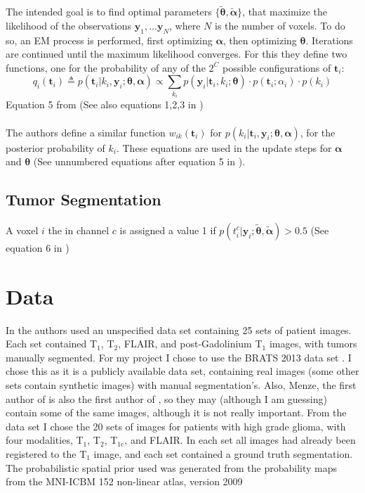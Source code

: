 \documentclass[10pt,twocolumn,letterpaper]{article}
\begin{document}
The intended goal is to find optimal parameters $\{\boldsymbol{\tilde{\theta}},\boldsymbol{\tilde{\alpha}}\}$, that maximize the likelihood of the observations $\boldsymbol{y}_1,...\boldsymbol{y}_N$, where $N$ is the number of voxels. To do so, an EM process is performed, first optimizing $\boldsymbol{\alpha}$, then optimizing $\boldsymbol{\theta}$. Iterations are continued until the maximum likelihood converges. For this they define two functions, one for the probability of any of the $2^C$ possible configurations of $\textbf{t}_i$:
\begin{equation}
q_i(\textbf{t}_i)\triangleq p(\textbf{t}_i|k_i,\textbf{y}_i;\boldsymbol{\theta},\boldsymbol{\alpha})\propto
\sum_{k_i} p(\textbf{y}_i| \textbf{t}_i, k_i;\boldsymbol{\theta})\cdot p(\textbf{t}_i;\alpha_i)\cdot p(k_i)
\end{equation}
Equation 5 from \cite{Menze2010}(See also equations 1,2,3 in \cite{Menze2010})
\\\\
The authors define a similar function $ w_{ik}(\textbf{t}_i)$ for $p(k_i|\textbf{t}_i,\textbf{y}_i;\boldsymbol{\theta},\boldsymbol{\alpha})$, for the posterior probability of $k_i$. These equations are used in the update steps for $\boldsymbol{\alpha}$ and $\boldsymbol{\theta}$ (See unnumbered equations after equation 5 in \cite{Menze2010}).

\subsection{Tumor Segmentation}

A voxel $i$ the in channel $c$ is assigned a value 1 if $p(t_i^c|\textbf{y}_i;\boldsymbol{\tilde{\theta}},\boldsymbol{\tilde{\alpha}})>0.5$ (See equation 6 in \cite{Menze2010})

\section{Data}
In \cite{Menze2010} the authors used an unspecified data set containing 25 sets of patient images. Each set contained T$_{\text{1}}$, T$_{\text{2}}$, FLAIR, and post-Gadolinium T$_{\text{1}}$ images, with tumors manually segmented. For my project I chose to use the BRATS 2013 data set \cite{brats}\cite{virtual_skeleton}. I chose this as it is a publicly available data set, containing real images (some other sets contain synthetic images) with manual segmentation's. Also, Menze, the first author of \cite{Menze2010} is also the first author of \cite{brats}, so they may (although I am guessing) contain some of the same images, although it is not really important. From the data set I chose the 20 sets of images for patients with high grade glioma, with four modalities, T$_{\text{1}}$, T$_{\text{2}}$, T$_{\text{1c}}$, and FLAIR. In each set all images had already been registered to the T$_{\text{1}}$ image, and each set contained a ground truth segmentation. The probabilistic spatial prior used was generated from the probability maps from the MNI-ICBM 152 non-linear atlas, version 2009 \cite{mni1}\cite{mni2}
\end{document}

